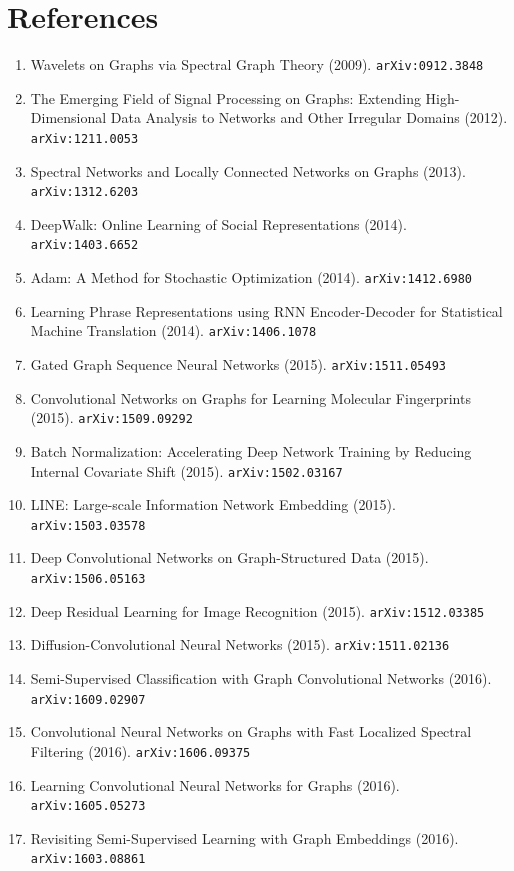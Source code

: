 \documentclass[11pt]{article}
\begin{document}
\section*{References}
\begin{enumerate}\small
  \item Wavelets on Graphs via Spectral Graph Theory (2009). \texttt{arXiv:0912.3848}
  \item The Emerging Field of Signal Processing on Graphs: Extending
  High-Dimensional Data Analysis to Networks and Other Irregular Domains (2012). \texttt{arXiv:1211.0053}
  \item Spectral Networks and Locally Connected Networks on Graphs (2013). \texttt{arXiv:1312.6203}
  \item DeepWalk: Online Learning of Social Representations (2014). \texttt{arXiv:1403.6652}
  \item Adam: A Method for Stochastic Optimization (2014). \texttt{arXiv:1412.6980}
  \item Learning Phrase Representations using RNN Encoder-Decoder for
  Statistical Machine Translation (2014). \texttt{arXiv:1406.1078}
  \item Gated Graph Sequence Neural Networks (2015). \texttt{arXiv:1511.05493}
  \item Convolutional Networks on Graphs for Learning Molecular Fingerprints (2015). \texttt{arXiv:1509.09292}
  \item Batch Normalization: Accelerating Deep Network Training by Reducing
  Internal Covariate Shift (2015). \texttt{arXiv:1502.03167}
  \item LINE: Large-scale Information Network Embedding (2015). \texttt{arXiv:1503.03578}
  \item Deep Convolutional Networks on Graph-Structured Data (2015). \texttt{arXiv:1506.05163}
  \item Deep Residual Learning for Image Recognition (2015). \texttt{arXiv:1512.03385}
  \item Diffusion-Convolutional Neural Networks (2015). \texttt{arXiv:1511.02136}
  \item Semi-Supervised Classification with Graph Convolutional Networks (2016). \texttt{arXiv:1609.02907}
  \item Convolutional Neural Networks on Graphs with Fast Localized Spectral
  Filtering (2016). \texttt{arXiv:1606.09375}
  \item Learning Convolutional Neural Networks for Graphs (2016). \texttt{arXiv:1605.05273}
  \item Revisiting Semi-Supervised Learning with Graph Embeddings (2016). \texttt{arXiv:1603.08861}

\end{enumerate}
\end{document}
